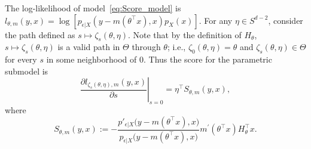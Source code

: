 {%
 The log-likelihood  of model~\eqref{eq:Score_model} is $l_{\theta, m}(y,x)= \log[ p_{\epsilon|X} (y-m(\theta^\top x),x) p_X(x)].$ For  any $\eta \in S^{d-2}$, consider the path defined as $s \mapsto \zeta_s(\theta,\eta)$. Note that by the definition of $H_\theta$, $s \mapsto \zeta_s(\theta,\eta)$ is  a valid path in $\Theta$ through $\theta$; i.e., $\zeta_0(\theta,\eta)=\theta$ and $\zeta_s(\theta,\eta) \in \Theta$ for every $s$ in some neighborhood of $0$. Thus the score for the parametric submodel is
\begin{equation}\label{eq:paraScore}
\left. \frac{\partial l_{\zeta_s(\theta,\eta), m} (y,x) }{\partial s}\right\vert_{s=0}= \eta^\top S_{\theta,m}(y,x),
\end{equation}
where
\begin{equation}\label{eq:S_def_118}
S_{\theta,m}(y,x):=   -\frac{p'_{\epsilon|X} \big(y-m(\theta^\top x),x\big)}{p_{\epsilon|X} \big(y-m(\theta^\top x),x\big)}m^\prime(\theta^\top x) H_\theta ^\top x.
\end{equation}

}
